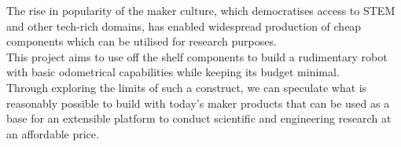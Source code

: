 
The rise in popularity of the maker culture, which democratises access to STEM and other tech-rich domains, has enabled widespread production of cheap components which can be utilised for research purposes.\\
This project aims to use off the shelf components to build a rudimentary robot with basic odometrical capabilities while keeping its budget minimal.\\
Through exploring the limits of such a construct, we can speculate what is reasonably possible to build with today's maker products that can
be used as a base for an extensible platform to conduct scientific and engineering research at an affordable price.
